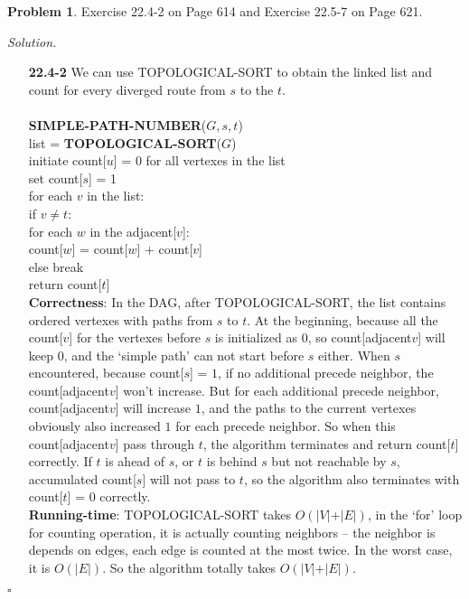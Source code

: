 \documentclass[11pt]{article}
\theoremstyle{definition}
\newtheorem{problem}{Problem}
\newenvironment{solution}{\noindent\emph{Solution.}}{\hfill$\square$}
\newcommand\tab[1][1cm]{\hspace*{#1}}
\begin{document}
\newpage



\begin{problem}
Exercise 22.4-2 on Page 614 and Exercise 22.5-7 on Page 621.
\end{problem}

\begin{solution}

\begin{enumerate}

 \item[\textbf{22.4-2}] 
 \tab We can use TOPOLOGICAL-SORT to obtain the linked list and count for every diverged route from $s$ to the $t$.\\ \\
 \textbf{SIMPLE-PATH-NUMBER}($G,s,t$)\\ 
 list = \textbf{TOPOLOGICAL-SORT}($G$)\\
 initiate count[$u$] = 0 for all vertexes in the list\\
 set count[$s$] = 1\\
 for each $v$ in the list:\\
 \tab if $v \neq t$:\\
 \tab \tab for each $w$ in the adjacent[$v$]:\\
 \tab \tab \tab count[$w$] = count[$w$] + count[$v$]\\
 \tab else break\\
 return count[$t$]\\
 
 \tab \textbf{Correctness}: In the DAG, after TOPOLOGICAL-SORT, the list contains ordered vertexes with paths from $s$ to $t$. At the beginning, because all the count[$v$] for the vertexes before $s$ is initialized as $0$, so count[adjacent$v$] will keep $0$, and the `simple path' can not start before $s$ either. When $s$ encountered, because count[$s$] = $1$, if no additional precede neighbor, the count[adjacent$v$] won't increase. But for each additional precede neighbor, count[adjacent$v$] will increase $1$, and the paths to the current vertexes obviously also increased $1$ for each precede neighbor. So when this count[adjacent$v$] pass through $t$, the algorithm terminates and return count[$t$] correctly. If $t$ is ahead of $s$, or $t$ is behind $s$ but not reachable by $s$, accumulated count[$s$] will not pass to $t$, so the algorithm also terminates with count[$t$] = $0$ correctly. \\
 \tab \textbf{Running-time}: TOPOLOGICAL-SORT takes $O(\vert V \vert + \vert E \vert)$, in the `for' loop for counting operation, it is actually counting neighbors -- the neighbor is depends on edges, each edge is counted at the most twice. In the worst case, it is $O(\vert E \vert)$. So the algorithm totally takes $O(\vert V \vert + \vert E \vert)$.
 

\end{enumerate}
\end{solution}
\end{document}
